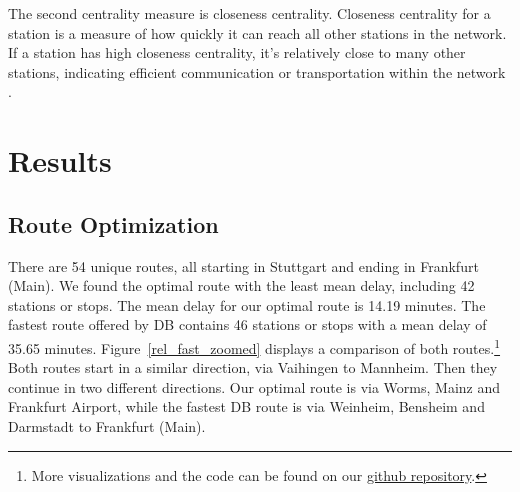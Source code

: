 \documentclass{article}
\theoremstyle{plain}
\theoremstyle{definition}
\theoremstyle{remark}
\begin{document}
	The second centrality measure is closeness centrality. Closeness centrality for a station is a measure of how quickly it can reach all other stations in the network. If a station has high closeness centrality, it's relatively close to many other stations, indicating efficient communication or transportation within the network \cite{generic_comp}.
	
	
	\section{Results}\label{sec:results}
	
	\subsection{Route Optimization}\label{sec:results_route}
	
	There are 54 unique routes, all starting in Stuttgart and ending in Frankfurt (Main). We found the optimal route with the least mean delay, including 42 stations or stops. The mean delay for our optimal route is 14.19 minutes. The fastest route offered by DB contains 46 stations or stops with a mean delay of 35.65 minutes. Figure~\ref{rel_fast_zoomed} displays a comparison of both routes.\footnote{More visualizations and the code can be found on our \href{https://github.com/frederikpanse/db_project}{github repository}.} Both routes start in a similar direction, via Vaihingen to Mannheim. Then they continue in two different directions. Our optimal route is via Worms, Mainz and Frankfurt Airport, while the fastest DB route is via Weinheim, Bensheim and Darmstadt to Frankfurt (Main).
	
\end{document}
